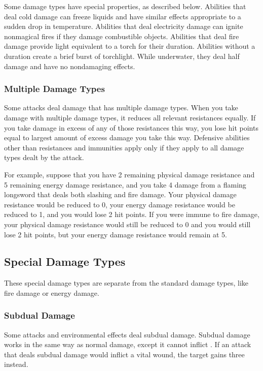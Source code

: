             Some damage types have special properties, as described below.
             Abilities that deal cold damage can freeze liquids and have similar effects appropriate to a sudden drop in temperature.
             Abilities that deal electricity damage can ignite nonmagical fires if they damage combustible objects.
             Abilities that deal fire damage provide light equivalent to a torch for their duration.
            Abilities without a duration create a brief burst of torchlight.
            While underwater, they deal half damage and have no nondamaging effects.

        \subsubsection{Multiple Damage Types}\label{Multiple Damage Types}
            Some attacks deal damage that has multiple damage types.
            When you take damage with multiple damage types, it reduces all relevant resistances equally.
            If you take damage in excess of any of those resistances this way, you lose hit points equal to largest amount of excess damage you take this way.
            Defensive abilities other than resistances and immunities apply only if they apply to all damage types dealt by the attack.

            For example, suppose that you have 2 remaining physical damage resistance and 5 remaining energy damage resistance, and you take 4 damage from a flaming longsword that deals both slashing and fire damage.
            Your physical damage resistance would be reduced to 0, your energy damage resistance would be reduced to 1, and you would lose 2 hit points.
            If you were immune to fire damage, your physical damage resistance would still be reduced to 0 and you would still lose 2 hit points, but your energy damage resistance would remain at 5.

    \subsection{Special Damage Types}\label{Special Damage Types}

        These special damage types are separate from the standard damage types, like fire damage or energy damage.

        \subsubsection{Subdual Damage}\label{Subdual Damage}
            Some attacks and environmental effects deal subdual damage.
            Subdual damage works in the same way as normal damage, except it cannot inflict .
            If an attack that deals subdual damage would inflict a vital wound, the target gains three  instead.

